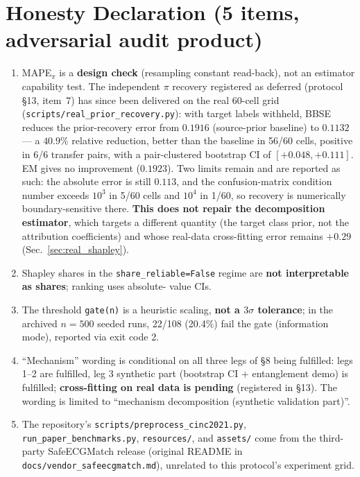 \documentclass[review,12pt,nonatbib]{elsarticle}
\begin{document}
\section*{Honesty Declaration (5 items, adversarial audit product)}
\label{sec:honesty}
\begin{enumerate}
    \item MAPE$_\pi$ is a \textbf{design check} (resampling constant
    read-back), not an estimator capability test. The independent $\pi$
    recovery registered as deferred (protocol \S13, item~7) has since
    been delivered on the real 60-cell grid
    (\texttt{scripts/real\_prior\_recovery.py}): with target labels withheld,
    BBSE reduces the prior-recovery error from $0.1916$ (source-prior
    baseline) to $0.1132$ --- a $40.9\%$ relative reduction, better than
    the baseline in 56/60 cells, positive in 6/6 transfer pairs, with a
    pair-clustered bootstrap CI of $[+0.048, +0.111]$. EM gives no
    improvement ($0.1923$). Two limits remain and are reported as such:
    the absolute error is still $0.113$, and the confusion-matrix
    condition number exceeds $10^3$ in 5/60 cells and $10^4$ in 1/60, so
    recovery is numerically boundary-sensitive there. \textbf{This does
    not repair the decomposition estimator}, which targets a different
    quantity (the target class prior, not the attribution coefficients)
    and whose real-data cross-fitting error remains $+0.29$
    (Sec.~\ref{sec:real_shapley}).
    \item Shapley shares in the \texttt{share\_reliable=False} regime
    are \textbf{not interpretable as shares}; ranking uses absolute-
    value CIs.
    \item The threshold \texttt{gate(n)} is a heuristic scaling,
    \textbf{not a $3\sigma$ tolerance}; in the archived $n=500$
    seeded runs, 22/108 (20.4\%) fail the gate (information mode),
    reported via exit code 2.
    \item ``Mechanism'' wording is conditional on all three legs of
    \S8 being fulfilled: legs 1--2 are fulfilled, leg 3 synthetic part
    (bootstrap CI + entanglement demo) is fulfilled;
    \textbf{cross-fitting on real data is pending} (registered in
    \S13). The wording is limited to ``mechanism decomposition
    (synthetic validation part)''.
    \item The repository's \texttt{scripts/preprocess\_cinc2021.py},
    \texttt{run\_paper\_benchmarks.py}, \texttt{resources/}, and
    \texttt{assets/} come from the third-party SafeECGMatch release
    (original README in \texttt{docs/vendor\_safeecgmatch.md}),
    unrelated to this protocol's experiment grid.
\end{enumerate}
\end{document}
